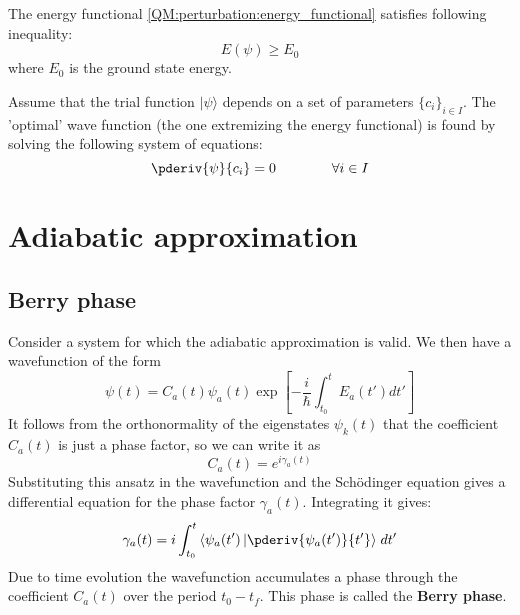 
	\begin{property}
    		The energy functional \ref{QM:perturbation:energy_functional} satisfies following inequality:
        	\begin{equation}
        		E(\psi) \geq E_0
        	\end{equation}
        	where $E_0$ is the ground state energy.
	\end{property}
    
	\begin{method}
	    	Assume that the trial function $|\psi\rangle$ depends on a set of parameters $\{c_i\}_{i\in I}$. The 'optimal' wave function (the one extremizing the energy functional) is found by solving the following system of equations:
	        \begin{equation}
	        	\pderiv{\psi}{c_i} = 0\qquad\qquad\forall i\in I
	        \end{equation}
	\end{method}
    
\section{Adiabatic approximation}
\subsection{Berry phase}

    	Consider a system for which the adiabatic approximation is valid. We then have a wavefunction of the form
        \begin{equation}
        	\psi(t) = C_a(t)\psi_a(t)\exp\left[-\frac{i}{\hbar}\int_{t_0}^tE_a(t')dt'\right]
        \end{equation}
    	It follows from the orthonormality of the eigenstates $\psi_k(t)$ that the coefficient $C_a(t)$ is just a phase factor, so we can write it as
        \begin{equation}
        	C_a(t) = e^{i\gamma_a(t)}
        \end{equation}
        Substituting this ansatz in the wavefunction and the Sch\"odinger equation gives a differential equation for the phase factor $\gamma_a(t)$. Integrating it gives:
        \begin{equation}
        	\label{QM:perturbation:berry:phase_factor}
        	\gamma_a(t) = i\int_{t_0}^t\left\langle\psi_a(t')\left|\pderiv{\psi_a(t')}{t'}\right\rangle\right. dt'
        \end{equation}
        Due to time evolution the wavefunction accumulates a phase through the coefficient $C_a(t)$ over the period $t_0-t_f$. This phase is called the \textbf{Berry phase}.
        
